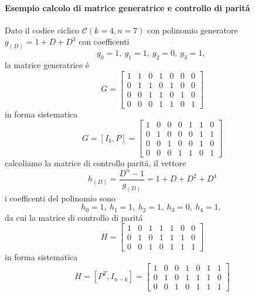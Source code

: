             \paragraph{Esempio calcolo di matrice generatrice e controllo di paritá}
                Dato il codice ciclico $\mathcal{C}(k=4,n=7)$ con polinomio generatore $g_{(D)} = 1+D+D^3$
                con coefficenti
                \[
                    g_0=1,\ g_1=1,\ g_2=0,\ g_3=1,\
                \]
                la matrice generatrice é
                \[
                    G = 
                    \begin{bmatrix}
                    1 & 1 & 0 & 1 & 0 & 0 & 0\\ 
                    0 & 1 & 1 & 0 & 1 & 0 & 0\\ 
                    0 & 0 & 1 & 1 & 0 & 1 & 0\\ 
                    0 & 0 & 0 & 1 & 1 & 0 & 1
                    \end{bmatrix}
                \] 
                in forma sistematica\[
                    G = [I_k,P] =
                    \begin{bmatrix}
                    1 & 0 & 0 & 0 & 1 & 1 & 0\\ 
                    0 & 1 & 0 & 0 & 0 & 1 & 1\\ 
                    0 & 0 & 1 & 0 & 0 & 1 & 0\\ 
                    0 & 0 & 0 & 1 & 1 & 0 & 1
                    \end{bmatrix}
                \] 
                calcoliamo la matrice di controllo paritá, il vettore 
                \[
                    h_{(D)} = \frac{D^n-1}{g_{(D)}} = 1+D+D^2+D^4
                \]
                i coefficenti del polinomio sono 
                \[
                    h_0=1,\ h_1=1,\ h_2=1,\ h_3=0,\ h_4=1,\
                \]
                da cui la matrice di controllo di paritá
                \[
                    H = 
                    \begin{bmatrix}
                    1 & 0 & 1 & 1 & 1 & 0 & 0\\ 
                    0 & 1 & 0 & 1 & 1 & 1 & 0\\ 
                    0 & 0 & 1 & 0 & 1 & 1 & 1
                    \end{bmatrix}
                \]
                in forma sistematica
                \[
                    H =[P^T,I_{n-k}]= 
                    \begin{bmatrix}
                    1 & 0 & 0 & 1 & 0 & 1 & 1\\ 
                    0 & 1 & 0 & 1 & 1 & 1 & 0\\ 
                    0 & 0 & 1 & 0 & 1 & 1 & 1
                    \end{bmatrix}
                \]
